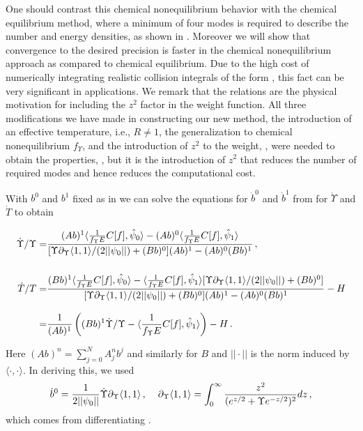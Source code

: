 One should contrast this chemical nonequilibrium behavior  with the chemical equilibrium method, where a minimum of four modes is required to describe the number and energy densities, as shown in .   Moreover we will show that convergence to the desired precision is faster in the chemical nonequilibrium approach as compared to chemical equilibrium. Due to the high cost of numerically integrating realistic collision integrals of the form , this fact can be very significant in applications. We remark that the relations  are the physical motivation for including the $z^2$ factor in the weight function. All three modifications we have made in constructing our new method, the introduction of an effective temperature, i.e., $R\ne 1$, the generalization to chemical nonequilibrium $f_\Upsilon $, and the introduction of $z^2$ to the weight, , were needed to obtain the properties, , but it is the introduction of $z^2$ that reduces the number of required modes and hence reduces the computational cost. 

With $b^0$ and $b^1$ fixed as in  we can solve the equations for $\dot b^0$ and $\dot b^1$ from  for $\dot\Upsilon$ and $\dot T$ to obtain

\begin{align}\label{UpsTEqs}
\dot{\Upsilon}/{\Upsilon}=&\frac{(Ab)^1\langle\frac{1}{f_\Upsilon E}C[f],\hat\psi_0\rangle-(Ab)^0\langle\frac{1}{f_\Upsilon E}C[f],\hat\psi_1\rangle }{[\Upsilon\partial_\Upsilon \langle1,1\rangle/(2||\psi_0||)+(Bb)^0](Ab)^1-(Ab)^0(Bb)^1}\,,\\[0.5cm]
\dot{T}/T
=&\frac{(Bb)^1\langle\frac{1}{f_\Upsilon E}C[f],\hat\psi_0\rangle-\langle\frac{1}{f_\Upsilon E}C[f],\hat\psi_1\rangle[\Upsilon\partial_\Upsilon \langle1,1\rangle/(2||\psi_0||)+(Bb)^0]}{[\Upsilon\partial_\Upsilon \langle1,1\rangle/(2||\psi_0||)+(Bb)^0](Ab)^1-(Ab)^0(Bb)^1}-H\notag\\[0.3cm]
=&\frac{1}{(Ab)^1}\left((Bb)^1\dot{\Upsilon}/\Upsilon-\langle\frac{1}{f_\Upsilon E}C[f],\hat\psi_1\rangle\right)-H\,.\label{Teq}
\end{align}

Here $(Ab)^n=\sum_{j=0}^NA^n_jb^j$ and similarly for $B$ and $||\cdot||$ is the norm induced by $\langle\cdot,\cdot\rangle$. In deriving this, we used
\begin{equation}
\dot{b}^0=\frac{1}{2||\psi_0||}\dot\Upsilon\partial_\Upsilon \langle1,1\rangle\,, \hspace{4mm} \partial_\Upsilon \langle1,1\rangle=\int_0^\infty \frac{z^2}{(e^{z/2}+ \Upsilon e^{-z/2})^2}dz\,,
\end{equation}
which comes from differentiating . 
 
